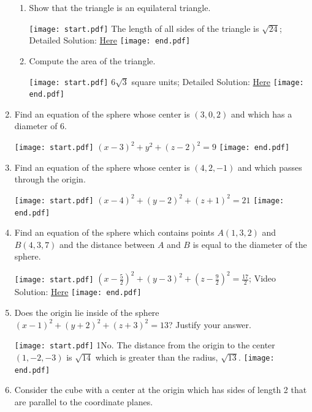 \documentclass[12pt]{article}
\begin{document}
\begin{enumerate}
\begin{enumerate}
\item Show that the triangle is an equilateral triangle.

\texttt{[image: start.pdf]}
{{The length of all sides of the triangle is $\sqrt{24}$; Detailed Solution: \textcolor{blue}{\href{http://www.math.drexel.edu/classes/Calculus/resources/Math200HW/Solutions/01_200_Rectangular_04.pdf}{Here}}}}
\texttt{[image: end.pdf]}


\item Compute the area of the triangle.

\texttt{[image: start.pdf]}
{{$6\sqrt{3}$ square units; Detailed Solution: \textcolor{blue}{\href{http://www.math.drexel.edu/classes/Calculus/resources/Math200HW/Solutions/01_200_Rectangular_04.pdf}{Here}}}}
\texttt{[image: end.pdf]}


\end{enumerate}

\item Find an equation of the sphere whose center is $(3,0,2)$ and which has a diameter of 6.

\texttt{[image: start.pdf]}
{{$(x-3)^2+y^2+(z-2)^2=9$}}
\texttt{[image: end.pdf]}


\item Find an equation of the sphere whose center is $(4,2,-1)$ and which passes through the origin.

\texttt{[image: start.pdf]}
{{$(x-4)^2+(y-2)^2+(z+1)^2=21$}}
\texttt{[image: end.pdf]}


\item Find an equation of the sphere which contains points $A(1,3,2)$ and $B(4,3,7)$ and the distance between $A$ and $B$ is equal to the diameter of the sphere.

\texttt{[image: start.pdf]}
{{$\left(x-\frac{5}{2}\right)^2+(y-3)^2+\left(z-\frac{9}{2}\right)^2=\frac{17}{2}$; Video Solution: \textcolor{blue}{\href{https://www.youtube.com/watch?v=kX4rI7KYVa4}{Here}}}}
\texttt{[image: end.pdf]}


\item Does the origin lie inside of the sphere $(x-1)^2+(y+2)^2+(z+3)^2=13$?  Justify your answer.

\texttt{[image: start.pdf]}
{{{1\linewidth}{No.  The distance from the origin to the center $(1,-2,-3)$ is $\sqrt{14}$ which is greater than the radius, $\sqrt{13}$.}}}
\texttt{[image: end.pdf]}


\newpage

\item Consider the cube with a center at the origin which has sides of length 2 that are parallel to the coordinate planes.  


\end{enumerate}
\end{document}
